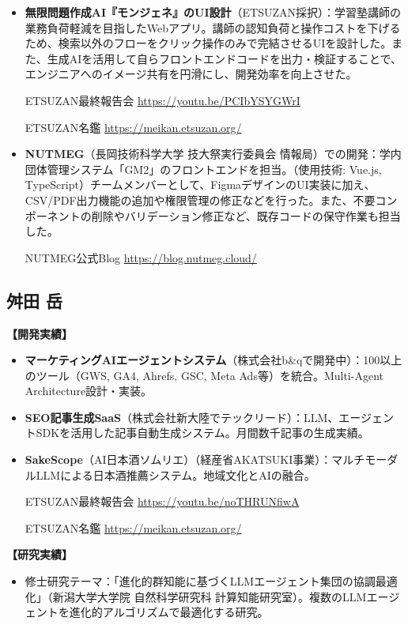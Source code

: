 \documentclass[paper=a4,fontsize=10.5bp,jafontsize=10.5bp,twocolumn]{jlreq}
\begin{document}
\begin{itemize}
  \item \textbf{無限問題作成AI『モンジェネ』のUI設計}（ETSUZAN採択）：学習塾講師の業務負荷軽減を目指したWebアプリ。講師の認知負荷と操作コストを下げるため、検索以外のフローをクリック操作のみで完結させるUIを設計した。また、生成AIを活用して自らフロントエンドコードを出力・検証することで、エンジニアへのイメージ共有を円滑にし、開発効率を向上させた。

  ETSUZAN最終報告会 \url{https://youtu.be/PCIbYSYGWrI}

  ETSUZAN名鑑 \url{https://meikan.etsuzan.org/}
  \item \textbf{NUTMEG}（長岡技術科学大学 技大祭実行委員会 情報局）での開発：学内団体管理システム「GM2」のフロントエンドを担当。（使用技術: Vue.js, TypeScript）チームメンバーとして、FigmaデザインのUI実装に加え、CSV/PDF出力機能の追加や権限管理の修正などを行った。また、不要コンポーネントの削除やバリデーション修正など、既存コードの保守作業も担当した。

  NUTMEG公式Blog \url{https://blog.nutmeg.cloud/}
\end{itemize}

\subsection*{舛田 岳}

\textbf{【開発実績】}
\begin{itemize}
  \item \textbf{マーケティングAIエージェントシステム}（株式会社b\&qで開発中）：100以上のツール（GWS, GA4, Ahrefs, GSC, Meta Ads等）を統合。Multi-Agent Architecture設計・実装。
  \item \textbf{SEO記事生成SaaS}（株式会社新大陸でテックリード）：LLM、エージェントSDKを活用した記事自動生成システム。月間数千記事の生成実績。
  \item \textbf{SakeScope}（AI日本酒ソムリエ）（経産省AKATSUKI事業）：マルチモーダルLLMによる日本酒推薦システム。地域文化とAIの融合。

  ETSUZAN最終報告会 \url{https://youtu.be/noTHRUNfiwA}

  ETSUZAN名鑑 \url{https://meikan.etsuzan.org/}
\end{itemize}

\textbf{【研究実績】}
\begin{itemize}
  \item 修士研究テーマ：「進化的群知能に基づくLLMエージェント集団の協調最適化」（新潟大学大学院 自然科学研究科 計算知能研究室）。複数のLLMエージェントを進化的アルゴリズムで最適化する研究。
\end{itemize}
\end{document}
